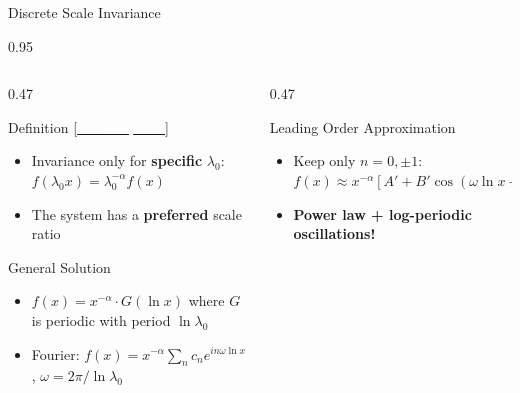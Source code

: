 \documentclass[9pt, aspectratio=169, t]{beamer}
\begin{document}
\begin{frame}{Discrete Scale Invariance}
    \begin{cminipage}{0.95\textwidth}
    {\footnotesize
    \begin{columns}[T]
        \begin{column}{0.47\textwidth}
            \begin{block}{Definition {\scriptsize[\href{https://doi.org/10.1016/S0370-1573(97)00076-8}{\textcolor{white}{Sornette, 1998}}]}}
                \begin{itemize}\setlength{\itemsep}{0pt}
                    \item Invariance only for \textbf{specific} $\lambda_0$: $f(\lambda_0 x) = \lambda_0^{-\alpha} f(x)$
                    \item The system has a \textbf{preferred} scale ratio
                \end{itemize}
            \end{block}

            \begin{block}{General Solution}
                \begin{itemize}\setlength{\itemsep}{1pt}
                    \item $f(x) = x^{-\alpha} \cdot G(\ln x)$ where $G$ is periodic with period $\ln\lambda_0$
                    \item Fourier: $f(x) = x^{-\alpha}\sum_n c_n e^{in\omega\ln x}$, $\omega = 2\pi/\ln\lambda_0$
                \end{itemize}
            \end{block}
        \end{column}
        \begin{column}{0.47\textwidth}
            \begin{exampleblock}{Leading Order Approximation}
                \begin{itemize}\setlength{\itemsep}{0pt}
                    \item Keep only $n = 0, \pm 1$: $f(x) \approx x^{-\alpha}[A' + B'\cos(\omega\ln x + \phi)]$
                    \item \textbf{Power law + log-periodic oscillations!}
                \end{itemize}
            \end{exampleblock}


\end{column}
\end{columns}}
\end{cminipage}
\end{frame}
\end{document}
